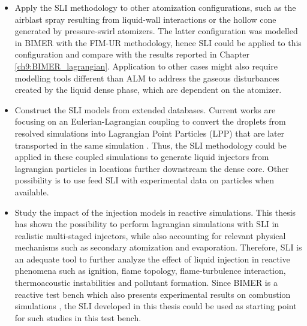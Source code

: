 \begin{itemize}
	\item Apply the SLI methodology to other atomization configurations, such as the airblast spray resulting from liquid-wall interactions or the hollow cone generated by pressure-swirl atomizers. The latter configuration was modelled in BIMER with the FIM-UR methodology, hence SLI could be applied to this configuration and compare with the results reported in Chapter \ref{ch9:BIMER_lagrangian}. Application to other cases might also require modelling tools different than ALM to address the gaseous disturbances created by the liquid dense phase, which are dependent on the atomizer.
	
	\item Construct the SLI models from extended databases. Current works are focusing on an Eulerian-Lagrangian coupling to convert the droplets from resolved simulations into Lagrangian Point Particles (LPP) that are later transported in the same simulation . Thus, the SLI methodology could be applied in these coupled simulations to generate liquid injectors from lagrangian particles in locations further downstream the dense core. Other possibility is to use feed SLI with experimental data on particles when available.  
	
	\item Study the impact of the injection models in reactive simulations. This thesis has shown the possibility to perform lagrangian simulations with SLI in realistic multi-staged injectors, while also accounting for relevant physical mechanisms such as secondary atomization and evaporation. Therefore, SLI is an adequate tool to further analyze the effect of liquid injection in reactive phenomena such as ignition, flame topology, flame-turbulence interaction, thermoacoustic instabilities and pollutant formation. Since BIMER is a reactive test bench which also presents experimental results on combustion simulations , the SLI developed in this thesis could be used as starting point for such studies in this test bench.
	
	
	



\end{itemize}

